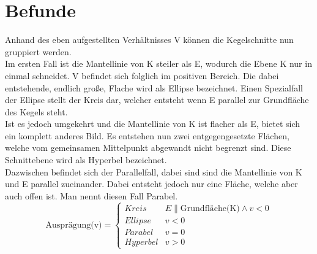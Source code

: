 \section{Befunde}
Anhand des eben aufgestellten Verhältnisses V können die Kegelschnitte nun gruppiert werden.\\
Im ersten  Fall ist die Mantellinie von K steiler als E, wodurch die Ebene K nur in einmal schneidet. V befindet sich folglich im positiven Bereich. Die dabei entstehende, endlich große, Flache wird als Ellipse bezeichnet. Einen Spezialfall der Ellipse stellt der Kreis dar, welcher entsteht wenn E parallel zur Grundfläche des Kegels steht.\\
Ist es jedoch umgekehrt und die Mantellinie von K ist flacher als E, bietet sich ein komplett anderes Bild. Es entstehen nun zwei entgegengesetzte Flächen, welche vom gemeinsamen Mittelpunkt abgewandt nicht begrenzt sind. Diese Schnittebene wird als Hyperbel bezeichnet.\\
Dazwischen befindet sich der Parallelfall, dabei sind sind die Mantellinie von K und E parallel zueinander. Dabei entsteht jedoch nur eine Fläche, welche aber auch offen ist. Man nennt diesen Fall Parabel.\\
\begin{displaymath}
   \text{Ausprägung(v)} = \left\{
     \begin{array}{lr}
       Kreis & E \parallel \text{Grundfläche(K)} \wedge v < 0 \\
       Ellipse & v < 0\\
       Parabel & v = 0\\
       Hyperbel & v > 0
     \end{array}
   \right.
\end{displaymath}